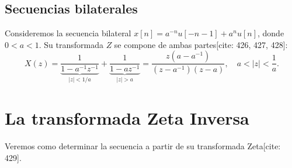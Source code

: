 \subsection{Secuencias bilaterales}
Consideremos la secuencia bilateral $x[n] = a^{-n} u[-n-1] + a^{n} u[n]$, donde $0<a<1$. Su transformada $Z$ se compone de ambas partes[cite: 426, 427, 428]:
\begin{equation}
	X(z) = \underbrace{\frac{1}{1-a^{-1} z^{-1}}}_{|z| < 1/a} + \underbrace{\frac{1}{1-a z^{-1}}}_{|z| > a} = \frac{z(a-a^{-1})}{(z-a^{-1})(z-a)}, \quad a < |z| < \frac{1}{a}.
\end{equation}

\section{La transformada Zeta Inversa}
Veremos como determinar la secuencia a partir de su transformada Zeta[cite: 429].


